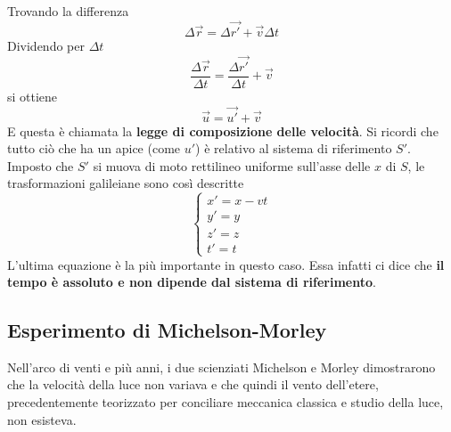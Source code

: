 Trovando la differenza
\begin{equation*}
  \Delta \vec{r} = \Delta\vec{r'}+\vec{v}\Delta t
\end{equation*}
Dividendo per $\Delta t$
\begin{equation*}
  \frac{\Delta\vec{r}}{\Delta t}=\frac{\Delta\vec{r'}}{\Delta t}+\vec{v}
\end{equation*}
si ottiene
\begin{equation*}
  \vec{u} = \vec{u'}+\vec{v}
\end{equation*}
E questa è chiamata la \textbf{legge di composizione delle velocità}. Si ricordi che tutto ciò che
ha un apice (come $u'$) è relativo al sistema di riferimento $S'$.\\ [\baselineskip]
Imposto che $S'$ si muova di moto rettilineo uniforme sull'asse delle $x$ di $S$, le trasformazioni
galileiane sono così descritte
\begin{equation*}
  \begin{cases}
    x' = x-vt\\
    y'=y\\
    z'=z\\
    t'=t
  \end{cases}
\end{equation*}
L'ultima equazione è la più importante in questo caso. Essa infatti ci dice che \textbf{il tempo è
assoluto e non dipende dal sistema di riferimento}. 

\subsection{Esperimento di Michelson-Morley}
Nell'arco di venti e più anni, i due scienziati Michelson e Morley dimostrarono che la velocità della
luce non variava e che quindi il vento dell'etere, precedentemente teorizzato per conciliare 
meccanica classica e studio della luce, non esisteva.
